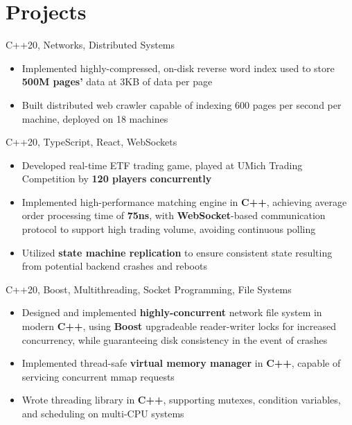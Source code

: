 \documentclass[letterpaper,11pt]{article}
\begin{document}
\section{Projects}
{C++20, Networks, Distributed Systems}{}
\begin{itemize}
  \item Implemented highly-compressed, on-disk reverse word index used to store
        \textbf{500M pages'} data at 3KB of data per page
  \item Built distributed web crawler capable of indexing 600 pages per second
        per machine, deployed on 18 machines
\end{itemize}
{C++20, TypeScript, React, WebSockets}{}
\begin{itemize}
  \item Developed real-time ETF trading game, played at UMich Trading Competition
        by \textbf{120 players concurrently}
  \item Implemented high-performance matching engine in \textbf{C++}, achieving average
        order processing time of \textbf{75ns}, with \textbf{WebSocket}-based
        communication protocol to support high
        trading volume, avoiding continuous polling
  \item Utilized \textbf{state machine replication} to ensure consistent state
        resulting from potential backend crashes and reboots
\end{itemize}
{C++20, Boost, Multithreading, Socket Programming, File Systems}{}
\begin{itemize}
  \item Designed and implemented \textbf{highly-concurrent} network file system in modern
        \textbf{C++}, using \textbf{Boost} upgradeable reader-writer locks for
        increased concurrency, while guaranteeing disk consistency in the event
        of crashes
\end{itemize}
\begin{itemize}
  \item Implemented thread-safe \textbf{virtual memory manager} in
        \textbf{C++}, capable of servicing concurrent mmap requests
  \item Wrote threading library in \textbf{C++}, supporting
        mutexes, condition variables, and scheduling on multi-CPU systems
\end{itemize}
\end{document}

